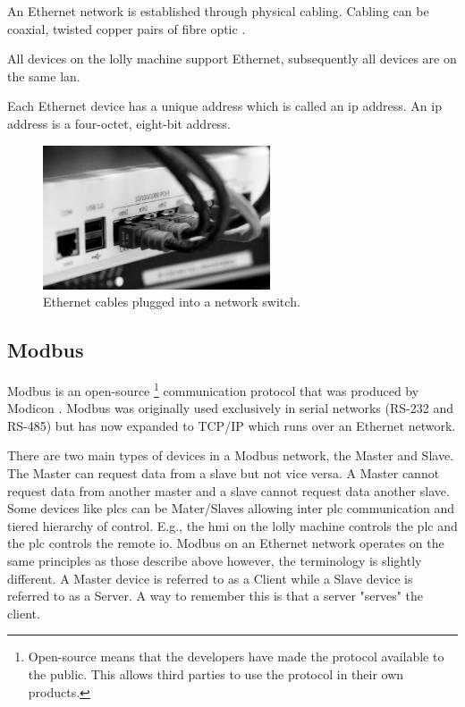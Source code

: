     An Ethernet network is established through physical cabling. Cabling can be coaxial, twisted copper pairs of fibre optic \cite{scott2021networking}.
    
    All devices on the lolly machine support Ethernet, subsequently all devices are on the same \acrshort{lan}.
    
    Each Ethernet device has a unique address which is called an \acrshort{ip} address. An \acrshort{ip} address is a four-octet, eight-bit address\cite{scott2021networking}.  
    
            \begin{figure}[H]
            \centering
            \includegraphics[width = 0.6\textwidth]{2_images/ethernetCables.png}
            \caption{Ethernet cables plugged into a network switch\cite{scott2021networking}.}
            \label{fig:ethenetCables}
        \end{figure} 
\newpage    
\subsection{Modbus}
    Modbus is an open-source \footnote{Open-source means that the developers have made the protocol available to the public. This allows third parties to use the protocol in their own products.} communication protocol that was produced by Modicon \cite{frenzel2015handbook}. Modbus was originally used exclusively in serial networks (RS-232 and RS-485) but has now expanded to TCP/IP which runs over an Ethernet network\cite{frenzel2015handbook}. 
    
    There are two main types of devices in a Modbus network, the Master and Slave\cite{frenzel2015handbook}. The Master can request data from a slave but not vice versa. A Master cannot request data from another master and a slave cannot request data another slave. Some devices like \acrshort{plc}s can be Mater/Slaves allowing inter \acrshort{plc} communication and tiered hierarchy of control. E.g., the \acrshort{hmi} on the lolly machine controls the \acrshort{plc} and the \acrshort{plc} controls the remote \acrshort{io}. Modbus on an Ethernet network operates on the same principles as those describe above however, the terminology is slightly different. A Master device is referred to as a Client while a Slave device is referred to as a Server. A way to remember this is that a server "serves" the client.
    
